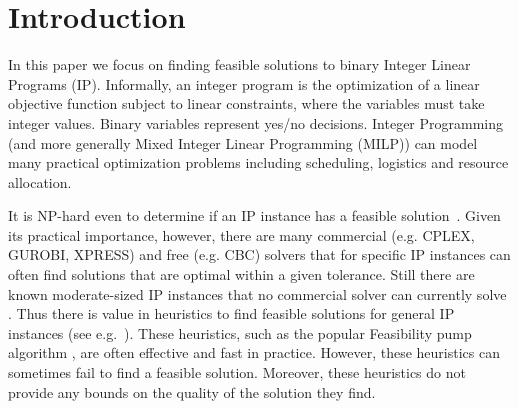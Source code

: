 \nocite{IPbook}

\iffalse{
\section{Introduction}\label{chapter:intro}

In combinatorial optimization the aim is to find the optimal solution in a discrete and
usually finite yet large set of solutions. For many specific combinatorial optimization problems such a solution can be found efficiently. For many others, finding optimal or in many cases near optimal solutions is NP-hard. A common approach to deal with such problems is relaxing the discrete solution set into a continuous set, where the optimization problem becomes tractable. Obtaining feasible solutions by means of such a relaxation requires an additional step of rounding the potentially fractional solution of the continuous relaxation into integer solutions.
}\fi

\section{Introduction}
In this paper we focus on finding feasible solutions to binary Integer Linear Programs (IP). Informally, an integer program is the optimization of a linear objective function subject to linear constraints, where the variables must take integer values. Binary variables represent yes/no decisions. Integer Programming (and more generally Mixed Integer Linear Programming (MILP)) can model many practical optimization problems including scheduling, logistics and resource allocation.

It is  NP-hard even to determine if an IP instance has a feasible solution~\cite{GareyJohnson}. Given its practical importance, however, there are many commercial (e.g. CPLEX, GUROBI, XPRESS) and free (e.g. CBC) solvers that for specific IP instances can often find solutions that are optimal within a given tolerance. Still there are known moderate-sized IP instances that no commercial solver can currently solve \cite{MIPLIB}. Thus there is value in heuristics to find feasible solutions for general IP instances (see e.g.~\cite{HanafiT2017}).
These heuristics, such as the popular Feasibility pump algorithm \cite{fp1,fp2}, are often effective and fast in practice. However, these heuristics can sometimes fail to find a feasible solution. Moreover, these heuristics do not provide any bounds on the quality of the solution they find. 

